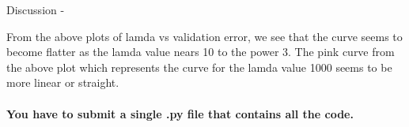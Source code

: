 \documentclass[11pt]{article}
\begin{document}
    Discussion -

From the above plots of lamda vs validation error, we see that the curve
seems to become flatter as the lamda value nears 10 to the power 3. The
pink curve from the above plot which represents the curve for the lamda
value 1000 seems to be more linear or straight.

    \hypertarget{you-have-to-submit-a-single-.py-file-that-contains-all-the-code.}{%
\paragraph{You have to submit a single .py file that contains all the
code.}\label{you-have-to-submit-a-single-.py-file-that-contains-all-the-code.}}


    
    
    
\end{document}
